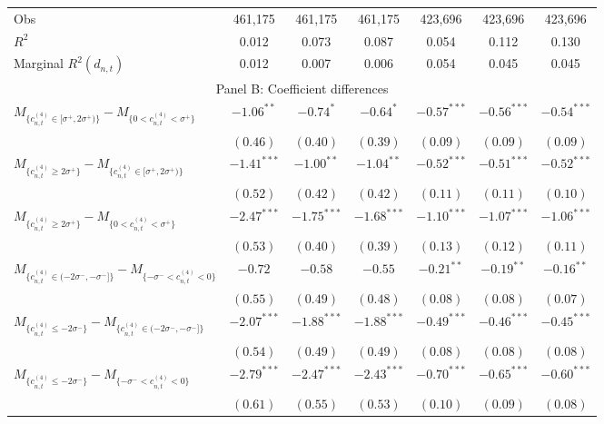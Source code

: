 \begin{tabular}{lcccccc}
  Obs & 461,175 & 461,175 & 461,175 & 423,696 & 423,696 & 423,696 \\
  $R^2$ & 0.012 & 0.073 & 0.087 & 0.054 & 0.112 & 0.130 \\
  Marginal $R^2(d_{n,t})$ & 0.012 & 0.007 & 0.006 & 0.054 & 0.045 & 0.045 \\
   \hline \multicolumn{7}{c}{Panel B: Coefficient differences} \\
 \hline  $M_{\{c^{(4)}_{n,t} \in [\sigma^+, 2\sigma^+)\}} - M_{\{0 < c^{(4)}_{n,t} < \sigma^+\}}$ & $-1.06^{**}$ & $-0.74^{*}$ & $-0.64^{*}$ & $-0.57^{***}$ & $-0.56^{***}$ & $-0.54^{***}$ \\
   & $(0.46)$ & $(0.40)$ & $(0.39)$ & $(0.09)$ & $(0.09)$ & $(0.09)$ \\
  $M_{\{c^{(4)}_{n,t} \ge 2\sigma^+\}} - M_{\{c^{(4)}_{n,t} \in [\sigma^+, 2\sigma^+)\}}$ & $-1.41^{***}$ & $-1.00^{**}$ & $-1.04^{**}$ & $-0.52^{***}$ & $-0.51^{***}$ & $-0.52^{***}$ \\
   & $(0.52)$ & $(0.42)$ & $(0.42)$ & $(0.11)$ & $(0.11)$ & $(0.10)$ \\
  $M_{\{c^{(4)}_{n,t} \ge 2\sigma^+\}} - M_{\{0 < c^{(4)}_{n,t} < \sigma^+\}}$ & $-2.47^{***}$ & $-1.75^{***}$ & $-1.68^{***}$ & $-1.10^{***}$ & $-1.07^{***}$ & $-1.06^{***}$ \\
   & $(0.53)$ & $(0.40)$ & $(0.39)$ & $(0.13)$ & $(0.12)$ & $(0.11)$ \\
  $M_{\{c^{(4)}_{n,t} \in (-2\sigma^-, -\sigma^-]\}} - M_{\{-\sigma^- < c^{(4)}_{n,t} < 0\}}$ & $-0.72$ & $-0.58$ & $-0.55$ & $-0.21^{**}$ & $-0.19^{**}$ & $-0.16^{**}$ \\
   & $(0.55)$ & $(0.49)$ & $(0.48)$ & $(0.08)$ & $(0.08)$ & $(0.07)$ \\
  $M_{\{c^{(4)}_{n,t} \le -2\sigma^-\}} - M_{\{c^{(4)}_{n,t} \in (-2\sigma^-, -\sigma^-]\}}$ & $-2.07^{***}$ & $-1.88^{***}$ & $-1.88^{***}$ & $-0.49^{***}$ & $-0.46^{***}$ & $-0.45^{***}$ \\
   & $(0.54)$ & $(0.49)$ & $(0.49)$ & $(0.08)$ & $(0.08)$ & $(0.08)$ \\
  $M_{\{c^{(4)}_{n,t} \le -2\sigma^-\}} - M_{\{-\sigma^- < c^{(4)}_{n,t} < 0\}}$ & $-2.79^{***}$ & $-2.47^{***}$ & $-2.43^{***}$ & $-0.70^{***}$ & $-0.65^{***}$ & $-0.60^{***}$ \\
   & $(0.61)$ & $(0.55)$ & $(0.53)$ & $(0.10)$ & $(0.09)$ & $(0.08)$ \\
   \hline 
\end{tabular}
